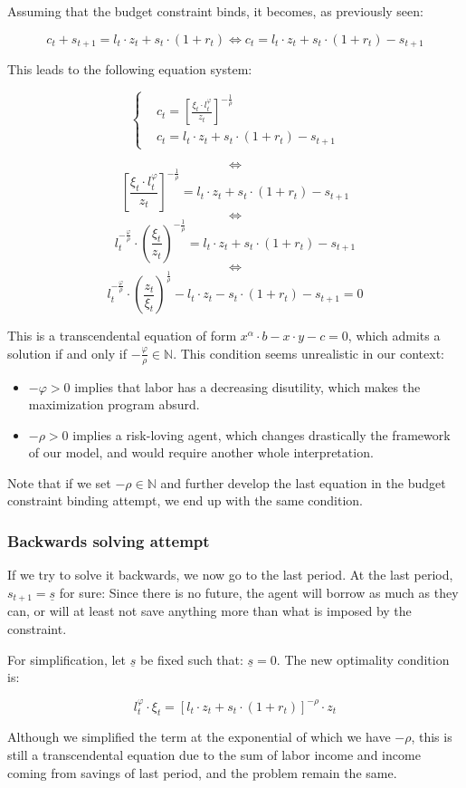 \documentclass{article}
\begin{document}
Assuming that the budget constraint binds, it becomes, as previously seen:

$$c_{t} + s_{t+1} = l_{t}\cdot z_{t} + s_{t}\cdot(1+r_{t})
\iff 
c_{t} = l_{t}\cdot z_{t} + s_{t}\cdot(1+r_{t}) - s_{t+1} 
$$

This leads to the following equation system: 

$$
\begin{cases}
    & c_t = \left[\frac{\xi_{t}\cdot l_{t}^{\varphi}}{z_{t}}\right]^{-\frac{1}{\rho}} \\
    & c_{t} = l_{t}\cdot z_{t} + s_{t}\cdot(1+r_{t}) - s_{t+1} 
\end{cases}
$$

$$\iff$$
$$ \left[\frac{\xi_{t}\cdot l_{t}^{\varphi}}{z_{t}}\right]^{-\frac{1}{\rho}} = l_{t}\cdot z_{t} + s_{t}\cdot(1+r_{t}) - s_{t+1} $$
$$\iff$$
$$ l_{t}^{-\frac{\varphi}{\rho}} \cdot \left(\frac{\xi_{t}}{z_{t}}\right)^{-\frac{1}{\rho}} = l_{t}\cdot z_{t} + s_{t}\cdot(1+r_{t}) - s_{t+1} $$
$$\iff$$
$$ l_{t}^{-\frac{\varphi}{\rho}} \cdot \left(\frac{z_{t}}{\xi_{t}}\right)^{\frac{1}{\rho}} - l_{t}\cdot z_{t} - s_{t}\cdot(1+r_{t}) - s_{t+1} = 0 $$

This is a transcendental equation of form 
$x^{\alpha}\cdot b - x\cdot y - c = 0$,
which admits a solution if and only if $-\frac{\varphi}{\rho} \in \mathbb{N}$.
This condition seems unrealistic in our context: 

\begin{itemize}
    \item $-\varphi >0$ implies that labor has a decreasing disutility,
    which makes the maximization program absurd.
    \item $-\rho >0$ implies a risk-loving agent, which changes 
    drastically the framework of our model, and would require another whole 
    interpretation.
\end{itemize}

Note that if we set $-\rho\in\mathbb{N}$ and further develop the last equation in the 
budget constraint binding attempt, we end up with the same condition.

\subsubsection{Backwards solving attempt}

If we try to solve it backwards, we now go to the last period. 
At the last period, $s_{t+1} = \underline{s}$ for sure:
Since there is no future, 
the agent will borrow as much as they can,
or will at least not save anything more than what is imposed 
by the constraint. 

For simplification, let $\underline{s}$ be fixed such that: $\underline{s} = 0$.
The new optimality condition is: 

\begin{equation}
    l_{t}^{\varphi}\cdot \xi_{t} = \left[l_{t}\cdot z_{t} + s_{t}\cdot(1+r_{t})\right]^{-\rho}\cdot z_{t}
\end{equation}

Although we simplified the term at the exponential of which 
we have $-\rho$, this is still a transcendental equation due to the sum 
of labor income and income coming from savings of last period, 
and the problem remain the same.
\end{document}
